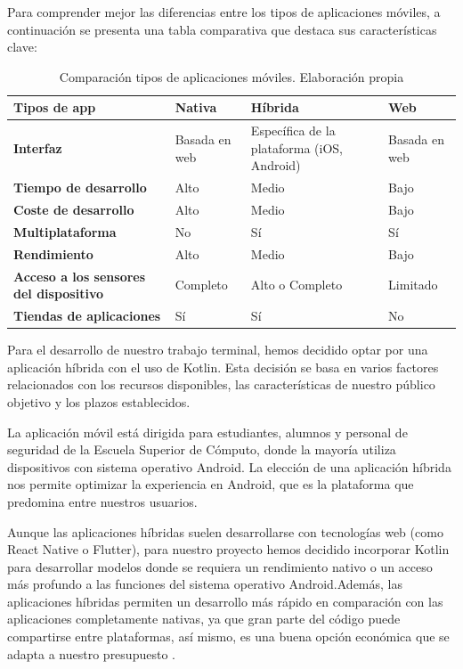 Para comprender mejor las diferencias entre los tipos de aplicaciones móviles, a continuación se presenta una tabla comparativa que destaca sus características clave:

\begin{table}[h!]
	\centering
	\begin{tabular}{|p{4cm}|p{2cm}|p{2cm}|p{2cm}|}
		\hline
		\textbf{Tipos de app} & \textbf{Nativa} & \textbf{Híbrida} & \textbf{Web} \\ \hline
		\textbf{Interfaz} & Basada en web & Específica de la plataforma (iOS, Android) & Basada en web \\ \hline
		\textbf{Tiempo de desarrollo} & Alto & Medio & Bajo \\ \hline
		\textbf{Coste de desarrollo} & Alto & Medio & Bajo \\ \hline
		\textbf{Multiplataforma} & No & Sí & Sí \\ \hline
		\textbf{Rendimiento} & Alto & Medio & Bajo \\ \hline
		\textbf{Acceso a los sensores del dispositivo} & Completo & Alto o Completo & Limitado \\ \hline
		\textbf{Tiendas de aplicaciones} & Sí & Sí & No \\ \hline
	\end{tabular}
	\caption{Comparación tipos de aplicaciones móviles. Elaboración propia}
	\label{tab:tipos_apps}
\end{table}

Para el desarrollo de nuestro trabajo terminal, hemos decidido optar por una aplicación híbrida con el uso de Kotlin. Esta decisión se basa en varios factores relacionados con los recursos disponibles, las características de nuestro público objetivo y los plazos establecidos. 

La aplicación móvil está dirigida para estudiantes, alumnos y personal de seguridad de la Escuela Superior de Cómputo, donde la mayoría utiliza dispositivos con sistema operativo Android. La elección de una aplicación híbrida nos permite optimizar  la experiencia en Android, que es la plataforma que predomina entre nuestros usuarios. 

Aunque las aplicaciones híbridas suelen desarrollarse con tecnologías web (como React Native o Flutter), para nuestro proyecto hemos decidido incorporar Kotlin para desarrollar modelos donde se requiera un rendimiento nativo o un acceso más profundo a las funciones del sistema operativo Android.Además, las aplicaciones híbridas permiten un desarrollo más rápido en comparación con las aplicaciones completamente nativas, ya que gran parte del código puede compartirse entre plataformas, así mismo, es una buena opción económica que se adapta a nuestro presupuesto \cite{IM1}. 